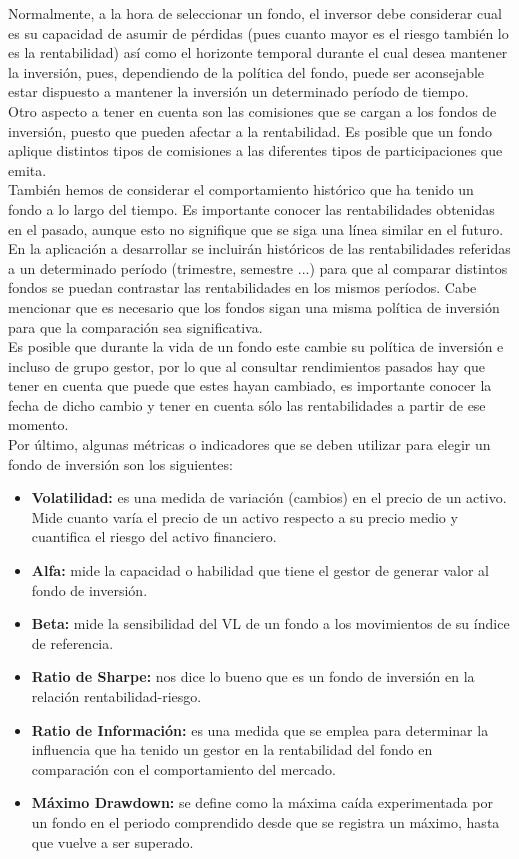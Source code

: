 \documentclass[12pt, a4paper]{article}
\begin{document}
Normalmente, a la hora de seleccionar un fondo, el inversor debe considerar cual es su capacidad de asumir de pérdidas (pues cuanto mayor es el riesgo también lo es la rentabilidad) así como el horizonte temporal durante el cual desea mantener la inversión, pues, dependiendo de la política del fondo, puede ser aconsejable estar dispuesto a mantener la inversión un determinado período de tiempo.\\

Otro aspecto a tener en cuenta son las comisiones que se cargan a los fondos de inversión, puesto que pueden afectar a la rentabilidad. Es posible que un fondo aplique distintos tipos de comisiones a las diferentes tipos de participaciones que emita.\\

También hemos de considerar el comportamiento histórico que ha tenido un fondo a lo largo del tiempo. Es importante conocer las rentabilidades obtenidas en el pasado, aunque esto no signifique que se siga una línea similar en el futuro. En la aplicación a desarrollar se incluirán históricos de las rentabilidades referidas a un determinado período (trimestre, semestre ...) para que al comparar distintos fondos se puedan contrastar las rentabilidades en los mismos períodos. Cabe mencionar que es necesario que los fondos sigan una misma política de inversión para que la comparación sea significativa.\\

Es posible que durante la vida de un fondo este cambie su política de inversión e incluso de grupo gestor, por lo que al consultar rendimientos pasados hay que tener en cuenta que puede que estes hayan cambiado,  es importante conocer la fecha de dicho cambio y tener en cuenta sólo las rentabilidades a partir de ese momento.\\

Por último, algunas métricas o indicadores que se deben utilizar para elegir un fondo de inversión son los siguientes:

\begin{itemize}
	\item \textbf{Volatilidad:} es una medida de variación (cambios) en el precio de un activo. Mide cuanto varía el precio de un activo respecto a su precio medio y cuantifica el riesgo del activo financiero.
	\item \textbf{Alfa:} mide la capacidad o habilidad que tiene el gestor de generar valor al fondo de inversión.
	\item \textbf{Beta:} mide la sensibilidad del \gls{VL} de un fondo a los movimientos de su índice de referencia.
	\item \textbf{Ratio de Sharpe:} nos dice lo bueno que es un fondo de inversión en la relación rentabilidad-riesgo.
	\item \textbf{Ratio de Información:}  es una medida que se emplea para determinar la influencia que ha tenido un gestor en la rentabilidad del fondo en comparación con el comportamiento del mercado.
	\item \textbf{Máximo Drawdown:} se define como la máxima caída experimentada por un fondo en el periodo comprendido desde que se registra un máximo, hasta que vuelve a ser superado.
\end{itemize}
\end{document}
